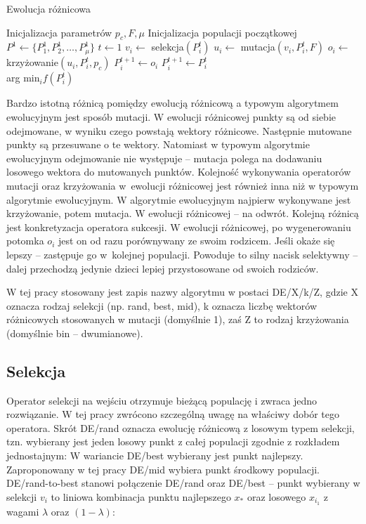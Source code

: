 \documentclass[a4paper,onecolumn,oneside,12pt,wide,floatssmall]{mwrep}
\theoremstyle{definition}
\theoremstyle{plain}%
\theoremstyle{remark}
\begin{document}
\begin{algorithm}[H]
\caption{Ewolucja różnicowa}
\label{algorithm:de}
\begin{algorithmic}[1]
\State Inicjalizacja parametrów $p_c, F, \mu$
\State Inicjalizacja populacji początkowej $P^1 \gets \{P^1_1, P^1_2, \ldots, P^1_\mu\}$
\State $t \gets 1$
    \State $v_i \gets$ selekcja$(P^t_i)$
    \State $u_i \gets$ mutacja$(v_i, P^t_i, F)$ 
    \State $o_i \gets$ krzy{\.z}owanie$(u_i, P_i^t, p_c)$    
        
      \State $P_i^{t+1} \gets o_i$     
    \Else 
      \State $P_i^{t+1} \gets P_i^{t}$
    \EndIf {}
  \EndFor
\EndWhile \\
\Return arg min$_i f(P^t_i)$ 
\end{algorithmic}
\end{algorithm}

Bardzo istotną różnicą pomiędzy ewolucją różnicową a typowym algorytmem ewolucyjnym jest sposób mutacji.
W ewolucji różnicowej punkty są od siebie odejmowane, w wyniku czego powstają wektory różnicowe. 
Następnie mutowane punkty są przesuwane o te wektory. Natomiast w typowym algorytmie ewolucyjnym
odejmowanie nie występuje -- mutacja polega na dodawaniu losowego wektora do mutowanych punktów.
Kolejność wykonywania operatorów mutacji oraz krzyżowania w~ewolucji różnicowej
jest również inna niż w typowym algorytmie ewolucyjnym.
W algorytmie ewolucyjnym najpierw wykonywane jest krzyżowanie, potem mutacja.
W ewolucji różnicowej -- na odwrót.
Kolejną różnicą jest konkretyzacja operatora sukcesji. W ewolucji różnicowej, po wygenerowaniu potomka
$o_i$ jest on od razu porównywany ze swoim rodzicem. Jeśli okaże się lepszy -- zastępuje go
w~kolejnej populacji. Powoduje to silny nacisk selektywny -- dalej przechodzą jedynie dzieci
lepiej przystosowane od swoich rodziców.

W tej pracy stosowany jest zapis nazwy algorytmu w postaci \mbox{DE/X/k/Z},
gdzie X oznacza rodzaj selekcji (np. rand, best, mid), k oznacza liczbę wektorów różnicowych stosowanych
w mutacji (domyślnie 1), zaś Z to rodzaj krzyżowania (domyślnie bin -- dwumianowe).

\subsection{Selekcja}

Operator selekcji na wejściu otrzymuje bieżącą populację i zwraca jedno rozwiązanie.
W tej pracy zwrócono szczególną uwagę na właściwy dobór tego operatora.
Skrót DE/rand oznacza ewolucję różnicową z losowym typem selekcji, tzn. wybierany jest jeden
losowy punkt z całej populacji zgodnie z rozkładem jednostajnym:
W wariancie DE/best wybierany jest punkt najlepszy. Zaproponowany w tej pracy DE/mid wybiera
punkt środkowy populacji. 
DE/rand-to-best stanowi połączenie DE/rand oraz DE/best -- punkt wybierany w selekcji $v_i$ 
to liniowa kombinacja punktu najlepszego $x_*$ oraz losowego $x_{i_1}$ z wagami $\lambda$ oraz $(1 - \lambda)$:
\end{document}
